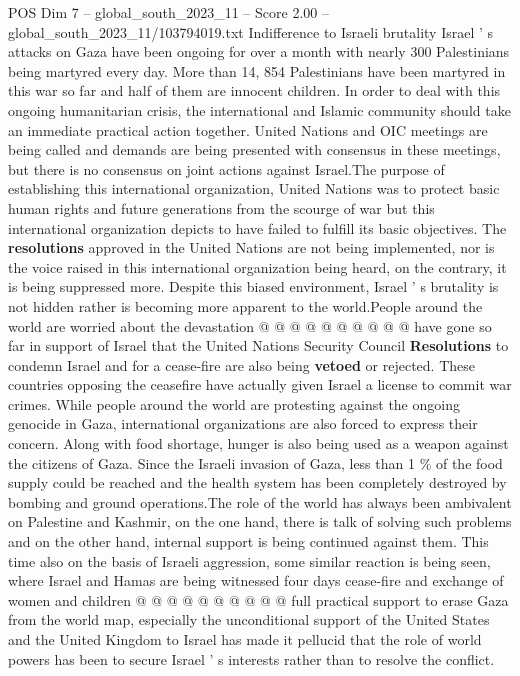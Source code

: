 \begin{textsample}{POS Dim 7 – global\_south\_2023\_11 – Score 2.00 – global\_south\_2023\_11/103794019.txt}  \label{ex:f7_pos_128}
Indifference to Israeli brutality Israel ' s attacks on Gaza have been ongoing for over a month with nearly 300 Palestinians being martyred every day.
More than 14, 854 Palestinians have been martyred in this war so far and half of them are innocent children.
In order to deal with this ongoing humanitarian crisis, the international and Islamic community should take an immediate practical action together.
United Nations and OIC meetings are being called and demands are being presented with consensus in these meetings, but there is no consensus on joint actions against Israel.The purpose of establishing this international organization, United Nations was to protect basic human rights and future generations from the scourge of war but this international organization depicts to have failed to fulfill its basic objectives.
The \textbf{resolutions} approved in the United Nations are not being implemented, nor is the voice raised in this international organization being heard, on the contrary, it is being suppressed more.
Despite this biased environment, Israel ' s brutality is not hidden rather is becoming more apparent to the world.People around the world are worried about the devastation @ @ @ @ @ @ @ @ @ @ have gone so far in support of Israel that the United Nations Security Council \textbf{Resolutions} to condemn Israel and for a cease-fire are also being \textbf{vetoed} or rejected.
These countries opposing the ceasefire have actually given Israel a license to commit war crimes.
While people around the world are protesting against the ongoing genocide in Gaza, international organizations are also forced to express their concern.
Along with food shortage, hunger is also being used as a weapon against the citizens of Gaza.
Since the Israeli invasion of Gaza, less than 1 \% of the food supply could be reached and the health system has been completely destroyed by bombing and ground operations.The role of the world has always been ambivalent on Palestine and Kashmir, on the one hand, there is talk of solving such problems and on the other hand, internal support is being continued against them.
This time also on the basis of Israeli aggression, some similar reaction is being seen, where Israel and Hamas are being witnessed four days cease-fire and exchange of women and children @ @ @ @ @ @ @ @ @ @ full practical support to erase Gaza from the world map, especially the unconditional support of the United States and the United Kingdom to Israel has made it pellucid that the role of world powers has been to secure Israel ' s interests rather than to resolve the conflict.

\end{textsample}
